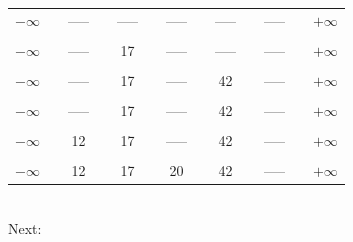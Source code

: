 \documentclass[english]{article}
\begin{document}
\begin{tabular}{ccccccccccccc}
    $-\infty$ &  & ----- &  & ----- &  & ----- &  & ----- &  & ----- &  & $+\infty$\tabularnewline
              &  &       &  &       &  &       &  &       &  &       &  & \tabularnewline
    $-\infty$ &  & ----- &  & 17    &  & ----- &  & ----- &  & ----- &  & $+\infty$\tabularnewline
              &  &       &  &       &  &       &  &       &  &       &  & \tabularnewline
    $-\infty$ &  & ----- &  & 17    &  & ----- &  & 42    &  & ----- &  & $+\infty$\tabularnewline
              &  &       &  &       &  &       &  &       &  &       &  & \tabularnewline
    $-\infty$ &  & ----- &  & 17    &  & ----- &  & 42    &  & ----- &  & $+\infty$\tabularnewline
              &  &       &  &       &  &       &  &       &  &       &  & \tabularnewline
    $-\infty$ &  & 12    &  & 17    &  & ----- &  & 42    &  & ----- &  & $+\infty$\tabularnewline
              &  &       &  &       &  &       &  &       &  &       &  & \tabularnewline
    $-\infty$ &  & 12    &  & 17    &  & 20    &  & 42    &  & ----- &  & $+\infty$\tabularnewline
    \end{tabular} \bigskip\\
    Next:\\
\end{document}
